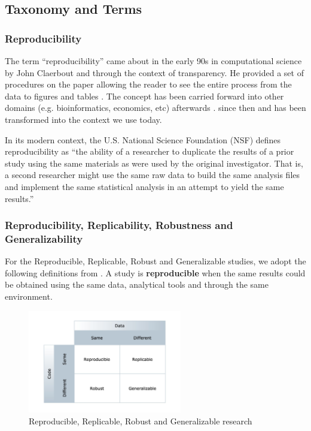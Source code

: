 \subsection{Taxonomy and Terms}

\subsubsection{Reproducibility}
The term “reproducibility” came about in the early 90s in computational science by John Claerbout and through the 
context of transparency. He provided a set of procedures on the paper allowing the reader to see the entire process 
from the data to figures and tables \cite{claerbout_electronic_1992}. The concept has been carried forward into 
other domains (e.g. bioinformatics, economics, etc) afterwards 
\cite{king_replication_1995,peng_reproducible_2006,schwab_making_2000}. since then and has been transformed into 
the context we use today.

In its modern context, the U.S. National Science Foundation (NSF) \cite{cacioppo_social_2015} defines reproducibility 
as “the ability of a researcher to duplicate the results of a prior study using the same materials as were used by 
the original investigator. That is, a second researcher might use the same raw data to build the same analysis files 
and implement the same statistical analysis in an attempt to yield the same results.” 

\subsubsection{Reproducibility, Replicability, Robustness and Generalizability}
For the Reproducible, Replicable, Robust and Generalizable studies, we adopt the following definitions 
from \cite{pineau_improving_2020}. A study is \textbf{reproducible} when the same results could be obtained using the same data, 
analytical tools and through the same environment.

\begin{figure}[ht]
    \centering
    \includegraphics[width=0.60\textwidth]{figures/01ReproducibleReplicable.jpg}
    \caption{Reproducible, Replicable, Robust and Generalizable research \cite{whitaker_showing_2017}}
    \label{fig:ReproducibleReplicable}
\end{figure}


